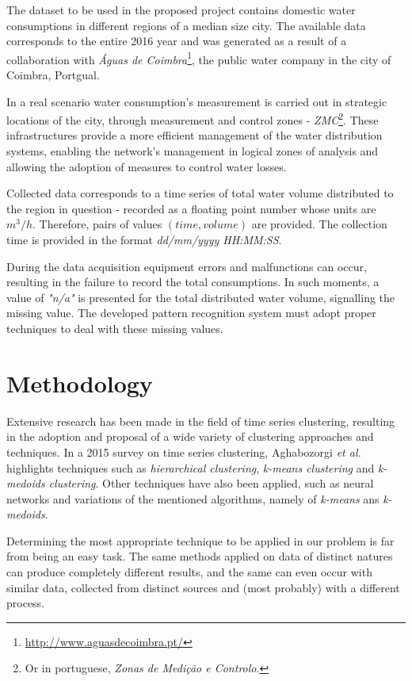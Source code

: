 \documentclass[9pt,journal,compsoc]{IEEEtran}
\begin{document}
The dataset to be used in the proposed project contains domestic water consumptions in different regions of a median size city. The available data corresponds to the entire 2016 year and was generated as a result of a collaboration with \emph{Águas de Coimbra}\footnote{\url{http://www.aguasdecoimbra.pt/}}, the public water company in the city of Coimbra, Portgual.

In a real scenario water consumption's measurement is carried out in strategic locations of the city, through measurement and control zones - \emph{ZMC}\footnote{Or in portuguese, \emph{Zonas de Medição e Controlo}.}. These infrastructures provide a more efficient management of the water distribution systems, enabling the network's management in logical zones of analysis and allowing the adoption of measures to control water losses.

Collected data corresponds to a time series of total water volume distributed to the region in question - recorded as a floating point number whose units are $m^{3}/h$. Therefore, pairs of values $(time, volume)$ are provided. The collection time is provided in the format \emph{dd/mm/yyyy HH:MM:SS}.

During the data acquisition equipment errors and malfunctions can occur, resulting in the failure to record the total consumptions. In such moments, a value of \emph{"n/a"} is presented for the total distributed water volume, signalling the missing value. The developed pattern recognition system must adopt proper techniques to deal with these missing values.

\section{Methodology}
\label{methodology}

Extensive research has been made in the field of time series clustering, resulting in the adoption and proposal of a wide variety of clustering approaches and techniques. In a 2015 survey on time series clustering, Aghabozorgi \emph{et al.} \cite{aghabozorgi2015time} highlights techniques such as \emph{hierarchical clustering}, \emph{k-means clustering} and \emph{k-medoids clustering}. Other techniques have also been applied, such as neural networks and variations of the mentioned algorithms, namely of \emph{k-means} ans \emph{k-medoids}.

Determining the most appropriate technique to be applied in our problem is far from being an easy task. The same methods applied on data of distinct natures can produce completely different results, and the same can even occur with similar data, collected from distinct sources and (most probably) with a different process.
\end{document}

